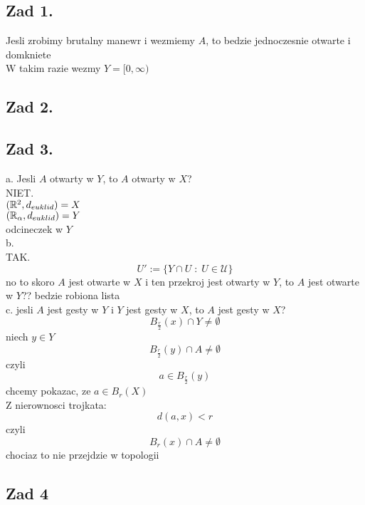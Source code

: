 \documentclass{article}
\begin{document}
\ttfamily
\subsection*{Zad 1.}
    Jesli zrobimy brutalny manewr i wezmiemy $A$, to bedzie jednoczesnie otwarte i domkniete \kotecek\medskip\\
    W takim razie wezmy $Y=[0, \infty)$
\subsection*{Zad 2. }
\subsection*{Zad 3.}
    {\Large\color{tit}a. Jesli $A$ otwarty w $Y$, to $A$ otwarty w $X$?}\medskip\\
    NIET.\\
    $(\mathbb{R}^2, d_{euklid})=X$\\
    $(\mathbb{R}_\alpha, d_{euklid})=Y$\\
    odcineczek w $Y$ \bigskip\\
    {\Large\color{tit}b.}\medskip\\
    TAK.\\
    $$U':=\{Y\cap U\;:\;U\in \mathcal{U}\}$$
    no to skoro $A$ jest otwarte w $X$ i ten przekroj jest otwarty w $Y$, to $A$ jest otwarte w $Y$?? bedzie robiona lista\\\kondow\bigskip
    {\Large\color{tit}c. jesli $A$ jest gesty w $Y$ i $Y$ jest gesty w $X$, to $A$ jest gesty w $X$?}
    $$B_\frac{r}2(x)\cap Y\neq\emptyset$$
    niech $y\in Y$
    $$B_\frac{r}2(y)\cap A\neq\emptyset$$
    czyli
    $$a\in B_\frac{r}2(y)$$
    chcemy pokazac, ze $a\in B_r(X)$\\
    Z nierownosci trojkata:
    $$d(a,x)< r$$
    czyli
    $$B_r(x)\cap A\neq \emptyset$$
    \kondow
    chociaz to nie przejdzie w topologii
\subsection*{Zad 4}
\end{document}
